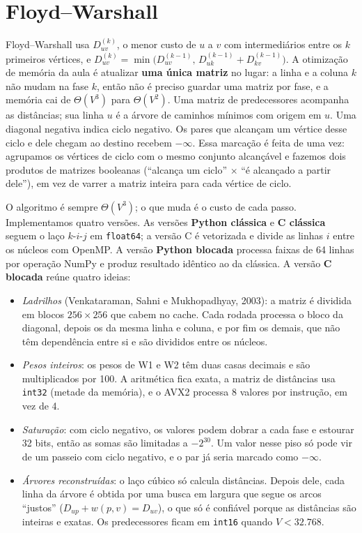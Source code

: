 \documentclass[a4paper,11pt]{article}
\begin{document}
\section{Floyd--Warshall}

Floyd--Warshall usa \(D^{(k)}_{uv}\), o menor custo de \(u\) a \(v\) com intermediários entre os \(k\) primeiros vértices, e \(D^{(k)}_{uv}=\min\bigl(D^{(k-1)}_{uv},\,D^{(k-1)}_{uk}+D^{(k-1)}_{kv}\bigr)\). A otimização de memória da aula é atualizar \textbf{uma única matriz} no lugar: a linha e a coluna \(k\) não mudam na fase \(k\), então não é preciso guardar uma matriz por fase, e a memória cai de \(\Theta(V^3)\) para \(\Theta(V^2)\). Uma matriz de predecessores acompanha as distâncias; sua linha \(u\) é a árvore de caminhos mínimos com origem em \(u\). Uma diagonal negativa indica ciclo negativo. Os pares que alcançam um vértice desse ciclo e dele chegam ao destino recebem \(-\infty\). Essa marcação é feita de uma vez: agrupamos os vértices de ciclo com o mesmo conjunto alcançável e fazemos dois produtos de matrizes booleanas (``alcança um ciclo'' \(\times\) ``é alcançado a partir dele''), em vez de varrer a matriz inteira para cada vértice de ciclo.

O algoritmo é sempre \(\Theta(V^3)\); o que muda é o custo de cada passo. Implementamos quatro versões. As versões \textbf{Python clássica} e \textbf{C clássica} seguem o laço \(k\)-\(i\)-\(j\) em \texttt{float64}; a versão C é vetorizada e divide as linhas \(i\) entre os núcleos com OpenMP. A versão \textbf{Python blocada} processa faixas de 64 linhas por operação NumPy e produz resultado idêntico ao da clássica. A versão \textbf{C blocada} reúne quatro ideias:
\begin{itemize}\setlength\itemsep{0pt}
\item \emph{Ladrilhos} (Venkataraman, Sahni e Mukhopadhyay, 2003): a matriz é dividida em blocos \(256\times256\) que cabem no cache. Cada rodada processa o bloco da diagonal, depois os da mesma linha e coluna, e por fim os demais, que não têm dependência entre si e são divididos entre os núcleos.
\item \emph{Pesos inteiros}: os pesos de W1 e W2 têm duas casas decimais e são multiplicados por 100. A aritmética fica exata, a matriz de distâncias usa \texttt{int32} (metade da memória), e o AVX2 processa 8 valores por instrução, em vez de 4.
\item \emph{Saturação}: com ciclo negativo, os valores podem dobrar a cada fase e estourar 32 bits, então as somas são limitadas a \(-2^{30}\). Um valor nesse piso só pode vir de um passeio com ciclo negativo, e o par já seria marcado como \(-\infty\).
\item \emph{Árvores reconstruídas}: o laço cúbico só calcula distâncias. Depois dele, cada linha da árvore é obtida por uma busca em largura que segue os arcos ``justos'' (\(D_{up}+w(p,v)=D_{uv}\)), o que só é confiável porque as distâncias são inteiras e exatas. Os predecessores ficam em \texttt{int16} quando \(V<32.768\).
\end{itemize}
\end{document}
